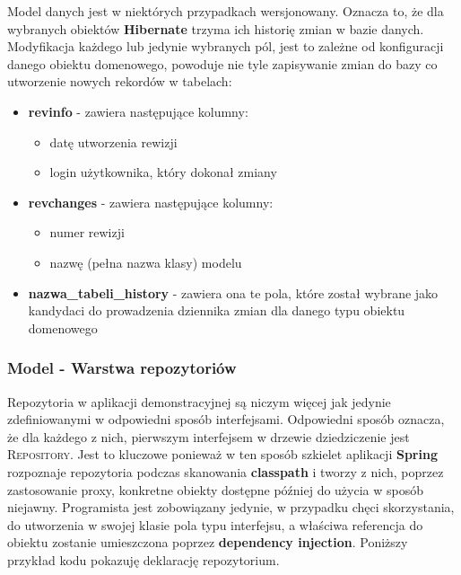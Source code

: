			Model danych jest w niektórych przypadkach wersjonowany. Oznacza to, że dla wybranych obiektów \textbf{Hibernate} trzyma ich historię zmian
			w bazie danych. Modyfikacja każdego lub jedynie wybranych pól, jest to zależne od konfiguracji danego obiektu domenowego, powoduje nie tyle
			zapisywanie zmian do bazy co utworzenie nowych rekordów w tabelach:
			\begin{itemize}
				\item \textbf{revinfo} - zawiera następujące kolumny:
				\begin{itemize}
					\item datę utworzenia rewizji
					\item login użytkownika, który dokonał zmiany
				\end{itemize} 
				\item \textbf{revchanges} - zawiera następujące kolumny:
				\begin{itemize}
					\item numer rewizji
					\item nazwę (pełna nazwa klasy) modelu
				\end{itemize}
				\item \textbf{nazwa\_tabeli\_history} - zawiera ona te pola, które został wybrane jako kandydaci do prowadzenia 
				dziennika zmian dla danego typu obiektu domenowego
			\end{itemize}
			
		\subsubsection{Model - Warstwa repozytoriów}
			Repozytoria w aplikacji demonstracyjnej są niczym więcej jak jedynie zdefiniowanymi w odpowiedni sposób interfejsami. 
			Odpowiedni sposób oznacza, że dla każdego z nich, pierwszym interfejsem w drzewie dziedziczenie jest \textsc{Repository}. 
			Jest to kluczowe ponieważ w ten sposób szkielet aplikacji \textbf{Spring} rozpoznaje repozytoria podczas
			skanowania \textbf{classpath} i tworzy z nich, poprzez zastosowanie proxy, konkretne obiekty dostępne później do użycia 
			w sposób niejawny. Programista jest zobowiązany jedynie, w przypadku chęci skorzystania, do utworzenia w swojej klasie
			pola typu interfejsu, a właściwa referencja do obiektu zostanie umieszczona poprzez \textbf{dependency injection}. 
			Poniższy przykład kodu pokazuję deklarację repozytorium. 
			
